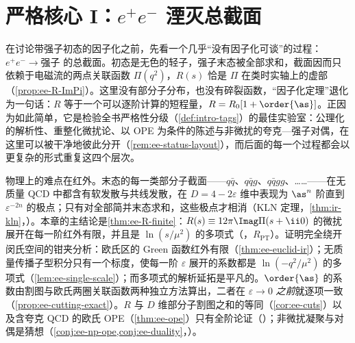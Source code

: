 \chapter{严格核心 I：$e^+e^-$ 湮灭总截面}\label{ch:ee}

在讨论带强子初态的因子化之前，先看一个几乎“没有因子化可谈”的过程：$e^+e^-\to\text{强子}$ 的总截面。初态是无色的轻子，强子末态被全部求和，截面因而只依赖于电磁流的两点关联函数 $\Pi(q^2)$，$R(s)$ 恰是 $\Pi$ 在类时实轴上的虚部（\cref{prop:ee-R-ImPi}）。这里没有部分子分布，也没有碎裂函数，“因子化定理”退化为一句话：$R$ 等于一个可以逐阶计算的短程量，$R=R_0[1+\order{\as}]$。正因为如此简单，它是检验全书严格性分级（\cref{def:intro-tags}）的最佳实验室：公理化的解析性、重整化微扰论、以 OPE 为条件的陈述与非微扰的夸克—强子对偶，在这里可以被干净地彼此分开（\cref{rem:ee-status-layout}），而后面的每一个过程都会以更复杂的形式重复这四个层次。

物理上的难点在红外。末态的每一类部分子截面——$q\bar q$、$q\bar qg$、$q\bar qgg$、……——在无质量 QCD 中都含有软发散与共线发散，在 $D=4-2\varepsilon$ 维中表现为 $\as^n$ 阶直到 $\varepsilon^{-2n}$ 的极点；只有对全部简并末态求和，这些极点才相消（KLN 定理，\cref{thm:ir-kln}，\tagA）。本章的主结论是\cref{thm:ee-R-finite}：$R(s)\equiv12\pi\Imag\Pi(s+\ii0)$ 的微扰展开在每一阶红外有限，并且是 $\ln(s/\mu^2)$ 的多项式（\tagR，$R_{\mathrm{PT}}$）。证明完全绕开闵氏空间的钳夹分析：欧氏区的 Green 函数红外有限（\cref{thm:ee-euclid-ir}）；无质量传播子型积分只有一个标度，使每一阶 $\varepsilon$ 展开的系数都是 $\ln(-q^2/\mu^2)$ 的多项式（\cref{lem:ee-single-scale}）；而多项式的解析延拓是平凡的。$\order{\as}$ 的系数由割图与欧氏两圈关联函数两种独立方法算出，二者在 $\varepsilon\to0$ \emph{之前}就逐项一致（\cref{prop:ee-cutting-exact}）。$R$ 与 $D$ 维部分子割图之和的等同（\cref{cor:ee-cuts}）以及含夸克 QCD 的欧氏 OPE（\cref{thm:ee-ope}）只有全阶论证（\tagA）；非微扰凝聚与对偶是猜想（\cref{conj:ee-np-ope,conj:ee-duality}，\tagC）。

